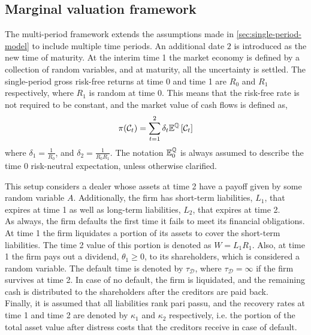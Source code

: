 \documentclass[main.tex]{subfiles}
\begin{document}
    \subsection{Marginal valuation framework}
        The multi-period framework extends the assumptions made in \cref{sec:single-period-model} to include multiple time periods.
        An additional date $2$ is introduced as the new time of maturity.
        At the interim time 1 the market economy is defined by a collection of random variables,
        and at maturity, all the uncertainty is settled. 
        The single-period gross risk-free returns at time 0 and time 1 are $R_0$ and $R_1$ respectively, where $R_1$ is random at time 0.
        This means that the risk-free rate is not required to be constant,
        and the market value of cash flows is defined as,
        \begin{equation}
        \pi(\mathcal{C}_{t}) = \sum_{t=1}^{2}\delta_t \mathbb{E}^{\mathbb{Q}}\left[\mathcal{C}_{t}\right]
        \end{equation}
        where $\delta_1 = \frac{1}{R_0}$,
        and $\delta_2 = \frac{1}{R_{0}R_{1}}$.
        The notation $\mathbb{E}_{0}^{\mathbb{Q}}$ is always assumed to describe the time 0 risk-neutral expectation, unless otherwise clarified.

        This setup considers a dealer whose assets at time 2 have a payoff given by some random variable $A$.
        Additionally, the firm has short-term liabilities, $L_1$, that expires at time 1 as well as long-term liabilities, $L_2$, that expires at time 2.
        \\
        As always, the firm defaults the first time it fails to meet its financial obligations.
        At time 1 the firm liquidates a portion of its assets to cover the short-term liabilities.
        The time 2 value of this portion is denoted as $W = L_1 R_1$.
        Also, at time 1 the firm pays out a dividend, $\theta_1 \geq 0$, to its shareholders,
        which is considered a random variable.
        The default time is denoted by $\tau_{\mathcal{D}}$,
        where $\tau_{\mathcal{D}} = \infty$ if the firm survives at time 2.
        In case of no default, the firm is liquidated, and the remaining cash is distributed to the shareholders after the creditors are paid back.
        \\
        Finally, it is assumed that all liabilities rank pari passu,
        and the recovery rates at time 1 and time 2 are denoted by $\kappa_1$ and $\kappa_2$ respectively,
        i.e. the portion of the total asset value after distress costs that the creditors receive in case of default.
\end{document}

